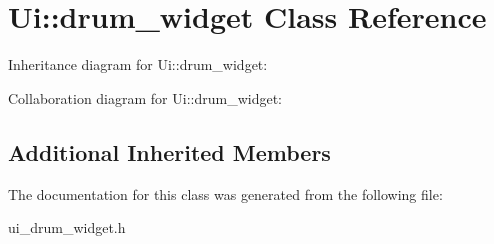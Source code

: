 \hypertarget{classUi_1_1drum__widget}{}\section{Ui\+:\+:drum\+\_\+widget Class Reference}
\label{classUi_1_1drum__widget}


Inheritance diagram for Ui\+:\+:drum\+\_\+widget\+:


Collaboration diagram for Ui\+:\+:drum\+\_\+widget\+:
\subsection*{Additional Inherited Members}


The documentation for this class was generated from the following file\+:\begin{DoxyCompactItemize}
\item 
ui\+\_\+drum\+\_\+widget.\+h\end{DoxyCompactItemize}
